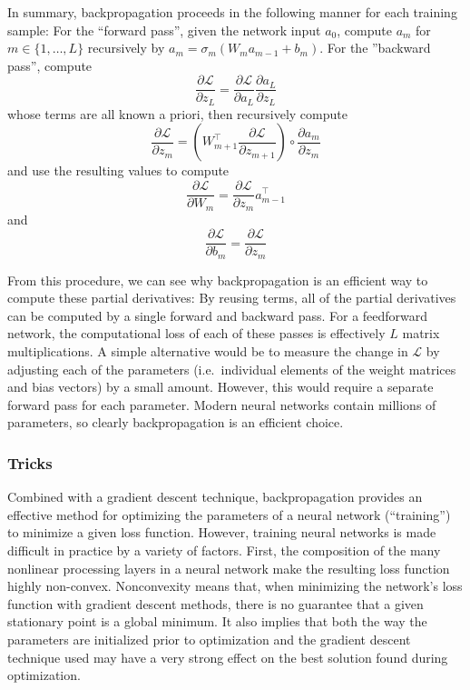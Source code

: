 In summary, backpropagation proceeds in the following manner for each training sample: For the ``forward pass'', given the network input $a_0$, compute $a_m$ for $m \in \{1, \ldots, L\}$ recursively by $a_m = \sigma_m(W_m a_{m - 1} + b_m)$.
For the ''backward pass'', compute
\begin{equation}
\frac{\partial \mathcal{L}}{\partial z_L} = \frac{\partial \mathcal{L}}{\partial a_L} \frac{\partial a_L}{\partial z_L}
\end{equation}
whose terms are all known a priori, then recursively compute
\begin{equation}
        \frac{\partial \mathcal{L}}{\partial z_m} = \left(W_{m + 1}^\top \frac{\partial \mathcal{L}}{\partial z_{m + 1}}\right) \circ \frac{\partial a_m}{\partial z_m}
\end{equation}
and use the resulting values to compute
\begin{equation}
        \frac{\partial \mathcal{L}}{\partial W_m} = \frac{\partial \mathcal{L}}{\partial z_m} a_{m - 1}^\top
\end{equation}
and
\begin{equation}
        \frac{\partial \mathcal{L}}{\partial b_m} = \frac{\partial \mathcal{L}}{\partial z_m}
\end{equation}

From this procedure, we can see why backpropagation is an efficient way to compute these partial derivatives: By reusing terms, all of the partial derivatives can be computed by a single forward and backward pass.
For a feedforward network, the computational loss of each of these passes is effectively $L$ matrix multiplications.
A simple alternative would be to measure the change in $\mathcal{L}$ by adjusting each of the parameters (i.e.\ individual elements of the weight matrices and bias vectors) by a small amount.
However, this would require a separate forward pass for each parameter.
Modern neural networks contain millions of parameters, so clearly backpropagation is an efficient choice.

\subsubsection{Tricks}

Combined with a gradient descent technique, backpropagation provides an effective method for optimizing the parameters of a neural network (``training'') to minimize a given loss function.
However, training neural networks is made difficult in practice by a variety of factors.
First, the composition of the many nonlinear processing layers in a neural network make the resulting loss function highly non-convex.
Nonconvexity means that, when minimizing the network's loss function with gradient descent methods, there is no guarantee that a given stationary point is a global minimum.
It also implies that both the way the parameters are initialized prior to optimization and the gradient descent technique used may have a very strong effect on the best solution found during optimization.

